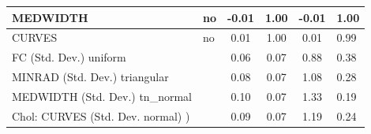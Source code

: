 \begin{table}
\begin{center}
\begin{tabular}{|l|l|c|c|c|l|}
			\hline
			MEDWIDTH & no & -0.01 & 1.00 & -0.01 & 1.00 \\
			\hline
			CURVES & no & 0.01 & 1.00 & 0.01 & 0.99 \\
			\hline
			FC (Std. Dev.) uniform &  & 0.06 & 0.07 & 0.88 & 0.38 \\
			\hline
			MINRAD (Std. Dev.) triangular &  & 0.08 & 0.07 & 1.08 & 0.28 \\
			\hline
			MEDWIDTH (Std. Dev.) tn_normal &  & 0.10 & 0.07 & 1.33 & 0.19 \\
			\hline
			 Chol: CURVES (Std. Dev. normal) ) &  & 0.09 & 0.07 & 1.19 & 0.24 \\
			\hline
		\end{tabular}
	\end{center}
\end{table}